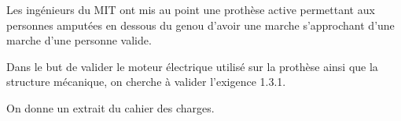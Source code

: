 \documentclass[10pt,fleqn]{article} %
\begin{document}

\vspace{2cm}
\pagestyle{fancy}
\thispagestyle{plain}



\ifprof
\else

Les ingénieurs du MIT ont mis au point une prothèse active permettant aux personnes amputées en dessous du genou d'avoir une marche s'approchant d'une marche d'une personne valide. 
\begin{obj} 
Dans le but de valider le moteur électrique utilisé sur la prothèse ainsi que la structure mécanique, on cherche à valider l'exigence 1.3.1.
\end{obj}

 On donne un extrait du cahier des charges.
 
\end{document}

